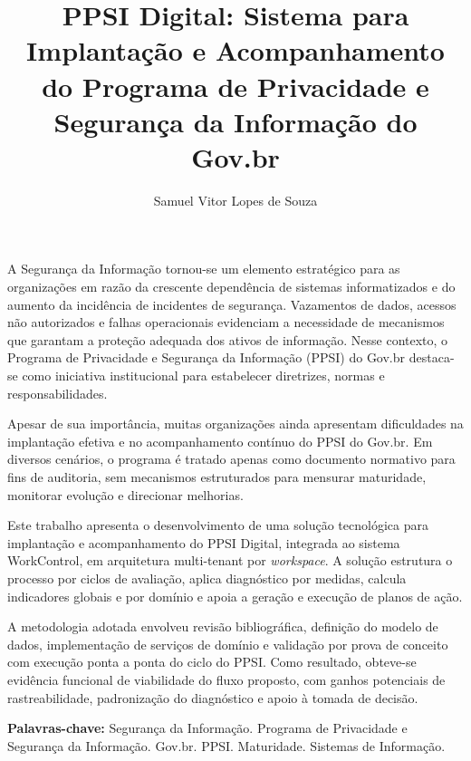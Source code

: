 \documentclass[12pt]{article}
\title{PPSI Digital: Sistema para Implantação e Acompanhamento do Programa de Privacidade e Segurança da Informação do Gov.br}
\author{Samuel Vitor Lopes de Souza}
\begin{document}
\maketitle

\begin{resumo}
A Segurança da Informação tornou-se um elemento estratégico para as organizações em razão da crescente dependência de sistemas informatizados e do aumento da incidência de incidentes de segurança. Vazamentos de dados, acessos não autorizados e falhas operacionais evidenciam a necessidade de mecanismos que garantam a proteção adequada dos ativos de informação. Nesse contexto, o Programa de Privacidade e Segurança da Informação (PPSI) do Gov.br destaca-se como iniciativa institucional para estabelecer diretrizes, normas e responsabilidades.

Apesar de sua importância, muitas organizações ainda apresentam dificuldades na implantação efetiva e no acompanhamento contínuo do PPSI do Gov.br. Em diversos cenários, o programa é tratado apenas como documento normativo para fins de auditoria, sem mecanismos estruturados para mensurar maturidade, monitorar evolução e direcionar melhorias.

Este trabalho apresenta o desenvolvimento de uma solução tecnológica para implantação e acompanhamento do PPSI Digital, integrada ao sistema WorkControl, em arquitetura multi-tenant por \textit{workspace}. A solução estrutura o processo por ciclos de avaliação, aplica diagnóstico por medidas, calcula indicadores globais e por domínio e apoia a geração e execução de planos de ação.

A metodologia adotada envolveu revisão bibliográfica, definição do modelo de dados, implementação de serviços de domínio e validação por prova de conceito com execução ponta a ponta do ciclo do PPSI. Como resultado, obteve-se evidência funcional de viabilidade do fluxo proposto, com ganhos potenciais de rastreabilidade, padronização do diagnóstico e apoio à tomada de decisão.
\end{resumo}

\noindent \textbf{Palavras-chave:} Segurança da Informação. Programa de Privacidade e Segurança da Informação. Gov.br. PPSI. Maturidade. Sistemas de Informação.
\end{document}
